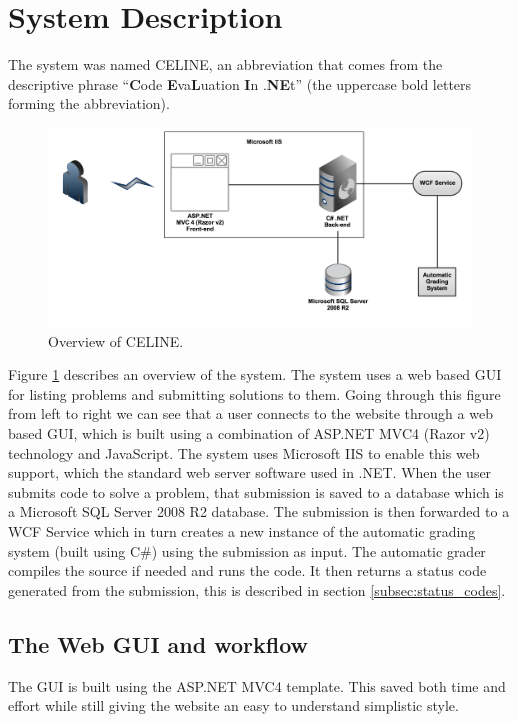 \section{System Description}
The system was named CELINE, an abbreviation that comes from the descriptive phrase ``\textbf{C}ode \textbf{E}va\textbf{L}uation \textbf{I}n .\textbf{NE}t'' (the uppercase bold letters forming the abbreviation).

\begin{figure}[h]
	\centering
	\includegraphics[width=0.9\linewidth]{chapters/media/overview.png}
	\caption{Overview of CELINE.}
	\label{fig:SystemOverview}
\end{figure}

Figure \ref{fig:SystemOverview} describes an overview of the system. The system uses a web based GUI for listing problems and submitting solutions to them. Going through this figure from left to right we can see that a user connects to the website through a web based GUI, which is built using a combination of ASP.NET MVC4 (Razor v2) technology and JavaScript. The system uses Microsoft IIS to enable this web support, which the standard web server software used in .NET. When the user submits code to solve a problem, that submission is saved to a database which is a Microsoft SQL Server 2008 R2 database. The submission is then forwarded to a WCF Service which in turn creates a new instance of the automatic grading system (built using C\#) using the submission as input. The automatic grader compiles the source if needed and runs the code. It then returns a status code generated from the submission, this is described in section \ref{subsec:status_codes}.


\subsection{The Web GUI and workflow}
The GUI is built using the ASP.NET MVC4 template. This saved both time and effort while still giving the website an easy to understand simplistic style.

